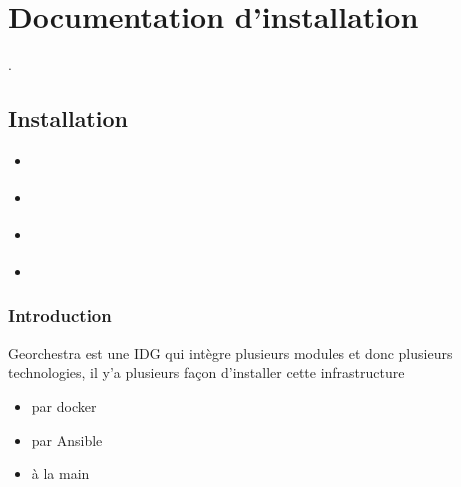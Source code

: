 \documentclass[letterpaper,10pt,french]{sphinxmanual}
\begin{document}
\sphinxstepscope


\chapter{Documentation d’installation}
\label{\detokenize{doc_instal:documentation-d-installation}}\label{\detokenize{doc_instal::doc}}
\sphinxAtStartPar
{}.

\sphinxstepscope


\section{Installation}
\label{\detokenize{doc_instal/installation:installation}}\label{\detokenize{doc_instal/installation::doc}}
\begin{sphinxShadowBox}
\begin{itemize}
\item {} 
\sphinxAtStartPar
{}\label{\detokenize{doc_instal/installation:id1}}{\hyperref[\detokenize{doc_instal/installation:introduction}]{}}

\item {} 
\sphinxAtStartPar
{}\label{\detokenize{doc_instal/installation:id2}}{\hyperref[\detokenize{doc_instal/installation:ansible}]{}}

\item {} 
\sphinxAtStartPar
{}\label{\detokenize{doc_instal/installation:id3}}{\hyperref[\detokenize{doc_instal/installation:serveur-web}]{}}

\item {} 
\sphinxAtStartPar
{}\label{\detokenize{doc_instal/installation:id4}}{\hyperref[\detokenize{doc_instal/installation:script-de-personnalisation}]{}}

\end{itemize}
\end{sphinxShadowBox}


\subsection{Introduction}
\label{\detokenize{doc_instal/installation:introduction}}
\sphinxAtStartPar
Georchestra est une IDG qui intègre plusieurs modules et donc plusieurs technologies, il y’a plusieurs façon d’installer cette infrastructure
\begin{itemize}
\item {} 
\sphinxAtStartPar
par docker

\item {} 
\sphinxAtStartPar
par Ansible

\item {} 
\sphinxAtStartPar
à la main

\end{itemize}
\end{document}
